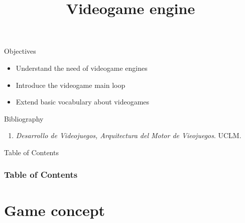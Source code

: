 \documentclass[10pt,compress]{beamer} %
\title[Videogame engine]{Videogame engine}
\author{}
\institute{\asignatura}
\date{}
\begin{document}
{\titlepageBlue
    \begin{frame}
        \titlepage
    \end{frame}
}

\begin{frame}[plain]{}
   \begin{block}{Objectives}
   \begin{itemize}
        \item Understand the need of videogame engines
		\item Introduce the videogame main loop
		\item Extend basic vocabulary about videogames
	\end{itemize}
	\end{block}

   \begin{block}{Bibliography}
      \begin{enumerate}
          \item  \textit{Desarrollo de Videojuegos, Arquitectura del Motor de Vieojuegos}. UCLM.
      \end{enumerate} 
   \end{block}
\end{frame}

{
\begin{frame}[shrink]{Table of Contents}
 \frametitle{Table of Contents}
 \tableofcontents
\end{frame}
}

\section{Game concept}
\end{document}
